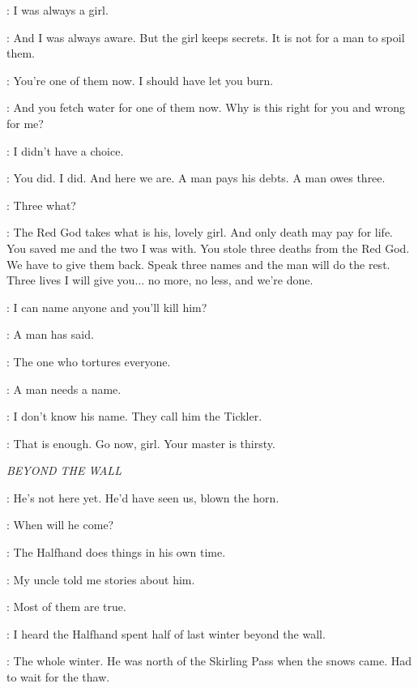\ARYA: I was always a girl. 

\JAQEN: And I was always aware. But the girl keeps secrets. It is not for a man to spoil them. 

\ARYA: You're one of them now. I should have let you burn. 

\JAQEN: And you fetch water for one of them now. Why is this right for you and wrong for me? 

\ARYA: I didn't have a choice. 

\JAQEN: You did. I did. And here we are. A man pays his debts. A man owes three. 

\ARYA: Three what? 

\JAQEN: The Red God takes what is his, lovely girl. And only death may pay for life. You saved me and the two I was with. You stole three deaths from the Red God. We have to give them back. Speak three names and the man will do the rest. Three lives I will give you$\ldots$ no more, no less, and we're done. 

\ARYA: I can name anyone and you'll kill him? 

\JAQEN: A man has said. 

\ARYA: The one who tortures everyone. 

\JAQEN: A man needs a name. 

\ARYA: I don't know his name. They call him the Tickler. 

\JAQEN: That is enough. Go now, girl. Your master is thirsty. 



\scene

\textit{BEYOND THE WALL} 


\JEOR: He's not here yet. He'd have seen us, blown the horn. 

\JON: When will he come? 

\JEOR: The Halfhand does things in his own time. 

\JON: My uncle told me stories about him. 

\JEOR: Most of them are true. 

\JON: I heard the Halfhand spent half of last winter beyond the wall. 

\JEOR: The whole winter. He was north of the Skirling Pass when the snows came. Had to wait for the thaw. 

